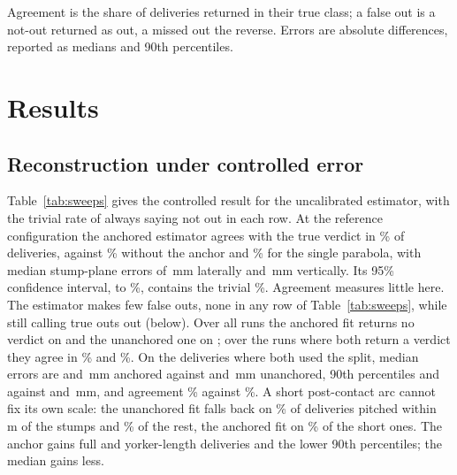 \documentclass[journal]{IEEEtran}
\begin{document}
Agreement is the share of deliveries returned in their true class; a false out is a not-out returned as
out, a missed out the reverse. Errors are absolute differences, reported as medians and 90th percentiles.

\section{Results}
\label{sec:results}

\subsection{Reconstruction under controlled error}

\begin{table}[t]
\centering
\caption{Experiment 1. Three estimators on identical synthetic detections, the same \GeoPerCell{} deliveries
in every row, one factor varied from the reference configuration (60\,Hz, 1\,px, 2\,px taps, 5\% dropout, physics on).
Errors (mm) are at the stump-plane crossing; false out counts not-out deliveries returned as out.
Settings of 0.5\,px, 120\,Hz, 4\,px taps and 10\% dropout were also run and are not shown.}
\label{tab:sweeps}
\scriptsize
\setlength{\tabcolsep}{2.3pt}

\end{table}

Table~\ref{tab:sweeps} gives the controlled result for the uncalibrated estimator, with the trivial rate
of always saying not out in each row. At the reference configuration the anchored estimator agrees with the
true verdict in \RefAgree\% of deliveries, against \RefAgreeUnanch\% without the anchor and
\RefAgreeParabola\% for the single parabola, with median stump-plane errors of \RefMedY\,mm laterally and
\RefMedZ\,mm vertically. Its 95\% confidence interval, \RefAgreeLo{} to \RefAgreeHi\%,
contains the trivial \RefAlwaysNotOutPct\%. Agreement measures little here. The estimator makes few false outs, none
in any row of Table~\ref{tab:sweeps}, while still calling true outs out (below). Over all \GeoRuns{} runs the anchored fit returns no
verdict on \GeoNoVerdict{} and the unanchored one on \GeoNoVerdictUnanch; over the \GeoBothVerdictN{} runs
where both return a verdict they agree in \GeoAgreeBothVerdict\% and \GeoAgreeBothVerdictUnanch\%.
On the \GeoPairN{} deliveries where both used the split, median errors are \GeoPairMedYA{} and
\GeoPairMedZA\,mm anchored against \GeoPairMedYU{} and \GeoPairMedZU\,mm unanchored, 90th percentiles
\GeoPairPNineZeroYA{} and \GeoPairPNineZeroZA{} against \GeoPairPNineZeroYU{} and \GeoPairPNineZeroZU\,mm,
and agreement \GeoPairAgreeA\% against \GeoPairAgreeU\%. A short post-contact arc cannot fix its own
scale: the unanchored fit falls back on \GeoUnanchFallbackShortPct\% of deliveries pitched within
\GeoShortLength\,m of the stumps and \GeoUnanchFallbackLongPct\% of the rest, the anchored fit on
\GeoAnchFallbackShortPct\% of the short ones. The anchor gains full and yorker-length deliveries and the
lower 90th percentiles; the median gains less.
\end{document}
